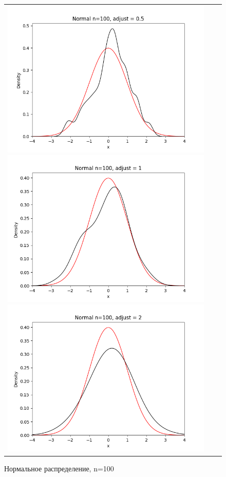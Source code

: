 \begin{figure}[H]
	\begin{tabular}{ccc}
		\includegraphics[scale=0.33]{normal_n100_adjust0.5.png}
		\includegraphics[scale=0.33]{normal_n100_adjust1.png}
		\includegraphics[scale=0.33]{normal_n100_adjust2.png}
	\end{tabular}
	\caption{Нормальное распределение, n=100}
\end{figure}


